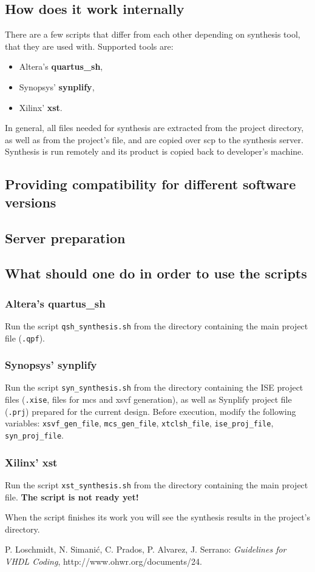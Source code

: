 \documentclass[a4paper,10pt]{article}
\begin{document}
\subsection{How does it work internally}
There are a few scripts that differ from each other depending on synthesis tool, that they are used with. Supported tools are:
\begin{itemize}
\item Altera's \textbf{quartus\_sh},
\item Synopsys' \textbf{synplify},
\item Xilinx' \textbf{xst}.
\end{itemize}
In general, all files needed for synthesis are extracted from the project directory, as well as from the project's file, and are copied over scp to the synthesis server. Synthesis is run remotely and its product is copied back to developer's machine.
\subsection{Providing compatibility for different software versions}
\subsection{Server preparation}
\subsection{What should one do in order to use the scripts}
\subsubsection{Altera's quartus\_sh}
Run the script \verb!qsh_synthesis.sh! from the directory containing the main project file (\verb!.qpf!).  
\subsubsection{Synopsys' synplify}
Run the script \verb!syn_synthesis.sh! from the directory containing the ISE project files (\verb!.xise!, files for mcs and xsvf generation), as well as Synplify project file (\verb!.prj!) prepared for the current design. Before execution, modify the following variables: \verb!xsvf_gen_file!, \verb!mcs_gen_file!, \verb!xtclsh_file!, \verb!ise_proj_file!, \verb!syn_proj_file!.

\subsubsection{Xilinx' xst}
Run the script \verb!xst_synthesis.sh! from the directory containing the main project file.  \textbf{The script is not ready yet!}
\vspace{1cm}

\noindent When the script finishes its work you will see the synthesis results in the project's directory.

\begin{thebibliography}{9}%
P. Loschmidt, N. Simanić, C. Prados,
P. Alvarez, J. Serrano: \emph{Guidelines for VHDL Coding},
http://www.ohwr.org/documents/24.
\end{thebibliography}
\end{document}

